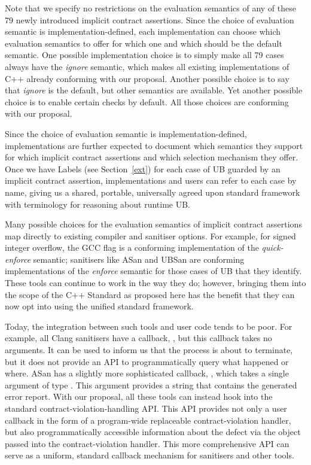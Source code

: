 Note that we specify no restrictions on the evaluation semantics of any of these 79 newly introduced  implicit contract assertions. Since the choice of evaluation semantic is implementation-defined, each implementation can choose which evaluation semantics to offer for which one and which should be the default semantic. One possible implementation choice is to simply make all 79 cases always have the \emph{ignore} semantic, which makes all existing implementations of C++ already conforming with our proposal. Another possible choice is to say that  \emph{ignore} is the default, but other semantics are available. Yet another possible choice is to enable certain checks by default. All those choices are conforming with our proposal.

Since the choice of evaluation semantic is  implementation-defined, implementations are further expected to document which semantics they support for which implicit contract assertions and which selection mechanism they offer. Once we have Labels (see Section~\ref{ext}) for each case of UB guarded by an implicit contract assertion, implementations and users can refer to each case by name, giving us a shared, portable, universally agreed upon standard framework with terminology for reasoning about runtime UB.

Many possible choices for the evaluation semantics of implicit contract assertions map directly to existing compiler and sanitiser options. For example, for signed integer overflow, the GCC flag  is a conforming implementation of the \emph{quick-enforce} semantic; sanitisers like ASan and UBSan are conforming implementations of the \emph{enforce} semantic for those cases of UB that they identify. These tools can continue to work in the way they do; however, bringing them into the scope of the C++ Standard as proposed here has the benefit that they can now opt into using the unified standard framework.

Today, the integration between such tools and user code tends to be poor. For example, all Clang sanitisers have a callback, , but this callback takes no arguments. It can be used to inform us that the process is about to terminate, but it does not provide an API to programmatically query what happened or where. ASan has a slightly more sophisticated callback, , which takes a single argument of type . This argument provides a string that contains the generated error report. With our proposal, all these tools can instead hook into the standard contract-violation-handling API. This API provides not only a user callback in the form of a  program-wide replaceable contract-violation handler, but also programmatically accessible information about the defect via the  \mbox{} object passed into the contract-violation handler. This more comprehensive API can serve as a uniform, standard callback mechanism for sanitisers and other tools.


